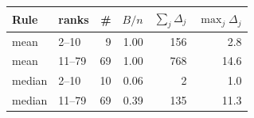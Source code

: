 \begin{tabular}{@{}llrrrr@{}}\toprule
Rule & ranks & \# & $B/n$ & $\sum_j\Delta_j$ & $\max_j\Delta_j$\\\midrule
mean & 2--10 & 9 & 1.00 & 156 & 2.8\\
mean & 11--79 & 69 & 1.00 & 768 & 14.6\\
median & 2--10 & 10 & 0.06 & 2 & 1.0\\
median & 11--79 & 69 & 0.39 & 135 & 11.3\\
\bottomrule\end{tabular}
